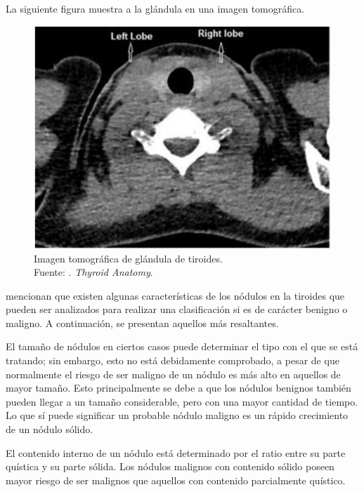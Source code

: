 La siguiente figura muestra a la glándula en una imagen tomográfica.

\begin{figure}[H]
	\begin{center}
		\includegraphics[width=1.00\textwidth]{2/figures/gland_thyroid.png}
		\caption[Imagen tomográfica de glándula de tiroides]{Imagen tomográfica de glándula de tiroides. \\
		Fuente: \cite{pr_binboga2019thyroid}. \textit{Thyroid Anatomy}.}
		\label{2:fig206}
	\end{center}
\end{figure}

\cite{pr_shin2016ultradiag} mencionan que existen algunas características de los nódulos en la tiroides que pueden ser analizados para realizar una clasificación si es de carácter benigno o maligno. A continuación, se presentan aquellos más resaltantes.

El tamaño de nódulos en ciertos casos puede determinar el tipo con el que se está tratando; sin embargo, esto no está debidamente comprobado, a pesar de que normalmente el riesgo de ser maligno de un nódulo es más alto en aquellos de mayor tamaño. Esto principalmente se debe a que los nódulos benignos también pueden llegar a un tamaño considerable, pero con una mayor cantidad de tiempo. Lo que sí puede significar un probable nódulo maligno es un rápido crecimiento de un nódulo sólido.

El contenido interno de un nódulo está determinado por el ratio entre su parte quística y su parte sólida. Los nódulos malignos con contenido sólido poseen mayor riesgo de ser malignos que aquellos con contenido parcialmente quístico.


